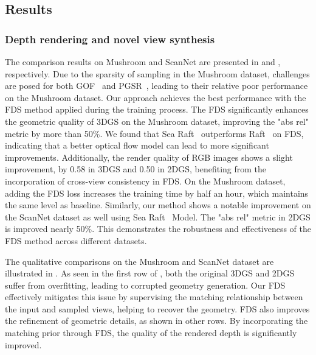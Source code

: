 \subsection{Results}
\subsubsection{Depth rendering and novel view synthesis}
The comparison results on Mushroom and 
ScanNet are presented in  
and , respectively. 
%
Due to the sparsity of sampling 
in the Mushroom dataset,
challenges are posed for both GOF~\citep{yu2024gaussian} 
and PGSR~\citep{chen2024pgsr}, 
leading to their relative poor performance 
on the Mushroom dataset.
%
Our approach achieves the best performance 
with the FDS method applied during the training process.
The FDS significantly enhances the 
geometric quality of 3DGS on the Mushroom dataset, 
improving the "abs rel" metric by more than 50\%.
%
We found that Sea Raft~\citep{wang2025sea}
outperforms Raft~\citep{teed2020raft} on FDS, 
indicating that a better optical flow model 
can lead to more significant improvements.
%
Additionally, the render quality of RGB 
images shows a slight improvement, 
by 0.58 in 3DGS and 0.50 in 2DGS, 
benefiting from the incorporation of cross-view consistency in FDS. 
%
On the Mushroom
dataset, adding the FDS loss increases 
the training time by half an hour, which maintains the same
level as baseline.
%
Similarly, our method shows a notable improvement on the ScanNet dataset as well using Sea Raft~\citep{wang2025sea} Model. The "abs rel" metric in 2DGS is improved nearly 50\%. This demonstrates the robustness and effectiveness of the FDS method across different datasets.
%


%         



The qualitative comparisons on the Mushroom and ScanNet dataset 
are illustrated in . 
%
%
As seen in the first row of , 
both the original 3DGS and 2DGS suffer from overfitting, 
leading to corrupted geometry generation. 
%
Our FDS effectively mitigates this issue by 
supervising the matching relationship between 
the input and sampled views, 
helping to recover the geometry.
%
FDS also improves the refinement of geometric details, 
as shown in other rows. 
By incorporating the matching prior through FDS, 
the quality of the rendered depth is significantly improved.
%

